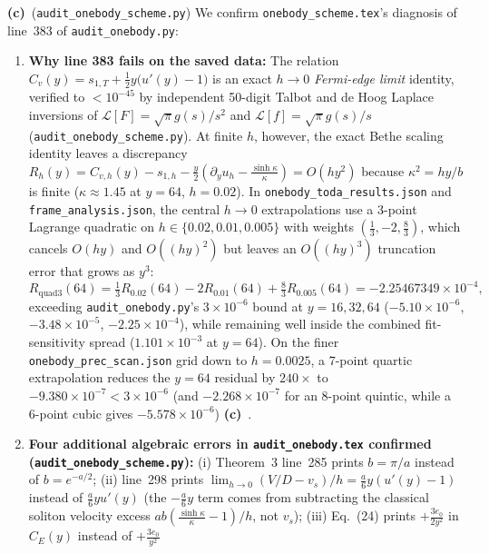 \documentclass[11pt,a4paper]{article}
\newcommand{\Lc}{\textbf{(c)}\ }
\newcommand{\scr}{\texttt{audit\_\allowbreak onebody\_\allowbreak scheme.py}}
\begin{document}
\Lc (\scr) We confirm \texttt{onebody\_\allowbreak scheme.tex}'s diagnosis of line~383 of
\texttt{audit\_\allowbreak onebody.py}:
\begin{enumerate}
  \item \textbf{Why line 383 fails on the saved data:}
  The relation $C_v(y) = s_{1,T} + \frac{1}{2}y\bigl(u'(y)-1\bigr)$ is an exact
  $h\to 0$ \emph{Fermi-edge limit} identity, verified to $<10^{-45}$ by independent
  50-digit Talbot and de Hoog Laplace inversions of
  $\mathcal{L}[F] = \sqrt{\pi}g(s)/s^2$ and $\mathcal{L}[f] = \sqrt{\pi}g(s)/s$ (\scr).
  At finite $h$, however, the exact Bethe scaling identity leaves a discrepancy
  $R_h(y) = C_{v,h}(y) - s_{1,h} - \frac{y}{2}(\partial_y u_h - \frac{\sinh\kappa}{\kappa}) = O(hy^2)$
  because $\kappa^2 = hy/b$ is finite ($\kappa \approx 1.45$ at $y=64$, $h=0.02$).
  In \texttt{onebody\_\allowbreak toda\_\allowbreak results.json} and
  \texttt{frame\_\allowbreak analysis.json}, the
  central $h\to 0$ extrapolations use a 3-point Lagrange quadratic on
  $h\in\{0.02,0.01,0.005\}$ with weights $(\frac{1}{3}, -2, \frac{8}{3})$, which
  cancels $O(hy)$ and $O((hy)^2)$ but leaves an $O((hy)^3)$ truncation error that
  grows as $y^3$:
  \begin{equation}
    R_{\mathrm{quad3}}(64) = \tfrac{1}{3}R_{0.02}(64) - 2R_{0.01}(64) + \tfrac{8}{3}R_{0.005}(64)
    = -2.25467349\times 10^{-4},
  \end{equation}
  exceeding \texttt{audit\_\allowbreak onebody.py}'s $3\times 10^{-6}$ bound at $y=16,32,64$
  ($-5.10\times 10^{-6}$, $-3.48\times 10^{-5}$, $-2.25\times 10^{-4}$), while
  remaining well inside the combined fit-sensitivity spread ($1.101\times 10^{-3}$ at $y=64$).
  On the finer \texttt{onebody\_\allowbreak prec\_\allowbreak scan.json} grid down to $h=0.0025$, a 7-point
  quartic extrapolation reduces the $y=64$ residual by $240\times$ to
  $-9.380\times 10^{-7} < 3\times 10^{-6}$ (and $-2.268\times 10^{-7}$ for an
  8-point quintic, while a 6-point cubic gives $-5.578\times 10^{-6}$) \Lc.
  \item \textbf{Four additional algebraic errors in \texttt{audit\_\allowbreak onebody.tex} confirmed (\scr):}
  (i) Theorem~3 line~285 prints $b = \pi/a$ instead of $b = e^{-a/2}$;
  (ii) line~298 prints $\lim_{h\to 0}(V/D - v_s)/h = \frac{a}{6}y(u'(y)-1)$ instead of
  $\frac{a}{6}yu'(y)$ (the $-\frac{a}{6}y$ term comes from subtracting the classical
  soliton velocity excess $ab(\frac{\sinh\kappa}{\kappa}-1)/h$, not $v_s$);
  (iii) Eq.~(24) prints $+\frac{3e_0}{2y^2}$ in $C_E(y)$ instead of $+\frac{3e_0}{y^2}$

\end{enumerate}
\end{document}
